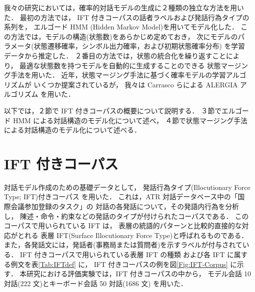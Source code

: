 我々の研究においては，確率的対話モデルの生成に２種類の独立な方法を用いた．
最初の方法では，
IFT 付きコーパスの話者ラベルおよび発話行為タイプの系列を，
エルゴード HMM (Hidden Markov Model)を用いてモデル化した．
この方法では，モデルの構造(状態数)をあらかじめ定めておき，
次にモデルのパラメータ(状態遷移確率，シンボル出力確率，および初期状態確率分布)
を学習データから推定した．
２番目の方法では，状態の統合化を繰り返すことにより，
最適な状態数を持つモデルを自動的に生成することのできる
状態マージング手法を用いた．
近年，状態マージング手法に基づく確率モデルの学習アルゴリズムが
いくつか提案されているが\cite{Stolcke94a,Stolcke94b}，
我々は Carrasco らによる ALERGIA アルゴリズム\cite{Carrasco94} を用いた．

以下では，２節で IFT 付きコーパスの概要について説明する．
３節でエルゴード HMM による対話構造のモデル化について述べ，
４節で状態マージング手法による対話構造のモデル化について述べる．


\section{IFT 付きコーパス}

対話モデル作成のための基礎データとして，
発話行為タイプ(Illocutionary Force Type; IFT)付きコーパス
\cite{Nagata92,Nagata94,Suzuki93}を用いた．
これは，ATR 対話データベース中の「国際会議参加登録のタスク」の
対話の各発話について，その発語内行為を分析し，
陳述・命令・約束などの発話のタイプが付けられたコーパスである．
このコーパスで用いられている IFT は，
表層の統語的パターンと比較的直接的な対応がとれる
表層 IFT(Surface Illocutionary Force Type)と呼ばれるものである．
また，各発話文には，発話者(事務局または質問者)を示すラベルが付与されている．
IFT 付きコーパスで用いられている表層 IFT の種類
および各 IFT に属する例文を表\ref{Tab:IFTdef} に，
IFT 付きコーパスの例を図\ref{Fig:IFT-Corpus} に示す．
本研究における評価実験では，IFT 付きコーパスの中から，
モデル会話 10 対話(222 文)とキーボード会話 50 対話(1686 文)
を用いた．


